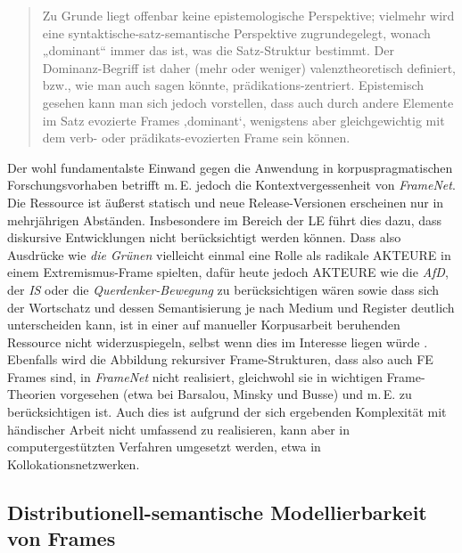 \begin{quote}
Zu Grunde liegt offenbar keine epistemologische Perspektive; vielmehr wird eine syntaktische-satz-semantische Perspektive zugrundegelegt, wonach „dominant`` immer das ist, was die Satz-Struktur bestimmt. Der Dominanz-Begriff ist daher (mehr oder weniger) valenztheoretisch definiert, bzw., wie man auch sagen könnte, prädikations-zentriert. Epistemisch gesehen kann man sich jedoch vorstellen, dass auch durch andere Elemente im Satz evozierte Frames ‚dominant`, wenigstens aber gleichgewichtig mit dem verb- oder prädikats-evozierten Frame sein können. \autocite[153]{busseFrameSemantikKompendium2012}
\end{quote}

Der wohl fundamentalste Einwand gegen die Anwendung in korpuspragmatischen Forschungsvorhaben betrifft m.\,E. jedoch die Kontextvergessenheit von \emph{FrameNet}. Die Ressource ist äußerst statisch und neue Release-Versionen erscheinen nur in mehrjährigen Abständen. Insbesondere im Bereich der LE führt dies dazu, dass diskursive Entwicklungen nicht berücksichtigt werden können. Dass also Ausdrücke wie \emph{die Grünen} vielleicht einmal eine Rolle als radikale AKTEURE in einem Extremismus-Frame spielten, dafür heute jedoch AKTEURE wie die \emph{AfD}, der \emph{IS} oder die \emph{Querdenker-Bewegung} zu berücksichtigen wären sowie dass sich der Wortschatz und dessen Semantisierung je nach Medium und Register deutlich unterscheiden kann, ist in einer auf manueller Korpusarbeit beruhenden Ressource nicht widerzuspiegeln, selbst wenn dies im Interesse liegen würde \autocite[siehe aber zu Ansätzen zur Automation z.\,B.][]{anwarGeneratingLexicalRepresentations2020}. Ebenfalls wird die Abbildung rekursiver Frame-Strukturen, dass also auch FE Frames sind, in \emph{FrameNet} nicht realisiert, gleichwohl sie in wichtigen Frame-Theorien vorgesehen (etwa bei Barsalou, Minsky und Busse) und m.\,E. zu berücksichtigen ist. Auch dies ist aufgrund der sich ergebenden Komplexität mit händischer Arbeit nicht umfassend zu realisieren, kann aber in computergestützten Verfahren umgesetzt werden, etwa in Kollokationsnetzwerken.

\subsection{Distributionell-semantische Modellierbarkeit von Frames}\label{distributionell-semantische-modellierbarkeit-von-frames}

